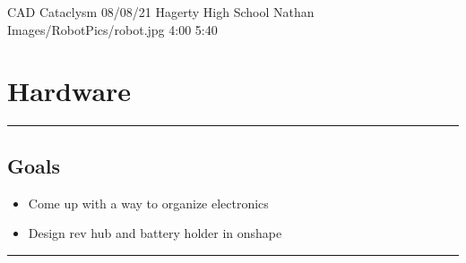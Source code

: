 \insertmeeting 
	{CAD Cataclysm} 
	{08/08/21}
	{Hagerty High School}
	{Nathan}
	{Images/RobotPics/robot.jpg}
	{4:00}
  {5:40}
	
\section*{Hardware}
\noindent\hfil\rule{\textwidth}{.4pt}\hfil
\subsection*{Goals}
\begin{itemize}
    \item Come up with a way to organize electronics
    \item Design rev hub and battery holder in onshape
  

\end{itemize} 

\noindent\hfil\rule{\textwidth}{.4pt}\hfil

